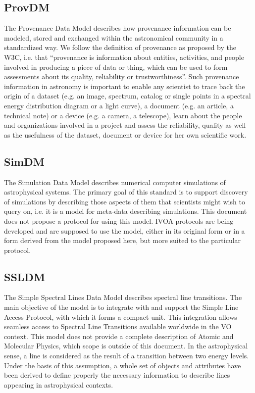 \documentclass[11pt,a4paper]{ivoa}
\begin{document}
\subsection{ProvDM}

The Provenance Data Model describes how provenance information can be modeled, stored 
and exchanged within the astronomical community in a standardized way. We follow the 
definition of provenance as proposed by the W3C, i.e. that ``provenance is information 
about entities, activities, and people involved in producing a piece of data or thing, 
which can be used to form assessments about its quality, reliability or trustworthiness''.
Such provenance information in astronomy is important to enable any scientist to trace 
back the origin of a dataset (e.g. an image, spectrum, catalog or single points in a 
spectral energy distribution diagram or a light curve), a document (e.g. an article, a 
technical note) or a device (e.g. a camera, a telescope), learn about the people and 
organizations involved in a project and assess the reliability, quality as well as the 
usefulness of the dataset, document or device for her own scientific work. 

\subsection{SimDM}

The Simulation Data Model describes numerical computer simulations of astrophysical systems. 
The primary goal of this standard is to support discovery of simulations by describing those 
aspects of them that scientists might wish to query on, i.e. it is a model for meta-data 
describing simulations. This document does not propose a protocol for using this model. 
IVOA protocols are being developed and are supposed to use the model, either in its original 
form or in a form derived from the model proposed here, but more suited to the particular protocol. 

\subsection{SSLDM}

The Simple Spectral Lines Data Model describes spectral line transitions. The main objective of 
the model is to integrate with and support the Simple Line Access Protocol, with which it forms 
a compact unit. This integration allows seamless access to Spectral Line Transitions available 
worldwide in the VO context. This model does not provide a complete description of Atomic and 
Molecular Physics, which scope is outside of this document. In the astrophysical sense, a line 
is considered as the result of a transition between two energy levels. Under the basis of this 
assumption, a whole set of objects and attributes have been derived to define properly the 
necessary information to describe lines appearing in astrophysical contexts.
\end{document}

